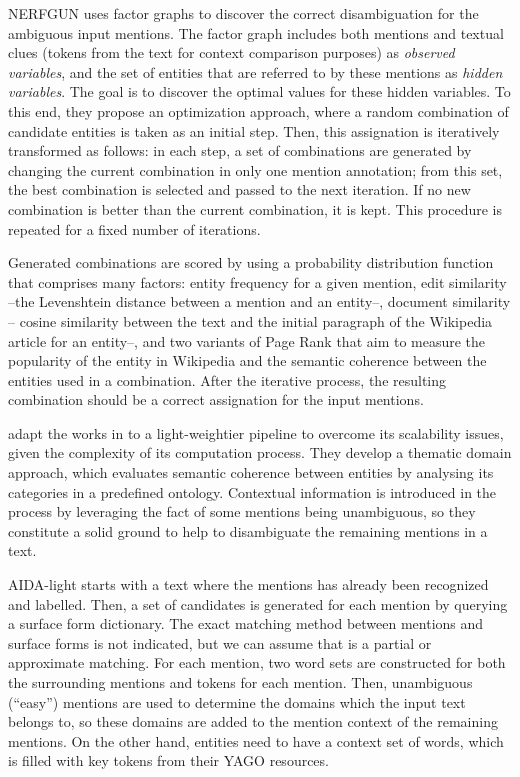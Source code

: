 NERFGUN uses factor graphs \cite{kschischang2001factorgraphs} to discover the correct disambiguation for the ambiguous input mentions. The factor graph includes both mentions and textual clues (tokens from the text for context comparison purposes) as \emph{observed variables}, and the set of entities that are referred to by these mentions as \emph{hidden variables}. The goal is to discover the optimal values for these hidden variables. To this end, they propose an optimization approach, where a random combination of candidate entities is taken as an initial step. Then, this assignation is iteratively transformed as follows: in each step, a set of combinations are generated by changing the current combination in only one mention annotation; from this set, the best combination is selected and passed to the next iteration. If no new combination is better than the current combination, it is kept. This procedure is repeated for a fixed number of iterations.

Generated combinations are scored by using a probability distribution function that comprises many factors:  entity frequency for a given mention, edit similarity --the Levenshtein distance between a mention and an entity--,  document similarity -- cosine similarity between the text and the initial paragraph of the Wikipedia article for an entity--, and two variants of Page Rank that aim to measure the popularity of the entity in Wikipedia and the semantic coherence between the entities used in a combination. After the iterative process, the resulting combination should be a correct assignation for the input mentions.

\medskip

\cite{nguyen2014} adapt the works in \cite{yosef2011} to a light-weightier pipeline to overcome its scalability issues, given the complexity of its computation process. They develop a thematic domain approach, which evaluates semantic coherence between entities by analysing its categories in a predefined ontology. Contextual information is introduced in the process by leveraging the fact of some mentions being unambiguous, so they constitute a solid ground to help to disambiguate the remaining mentions in a text.

AIDA-light starts with a text where the mentions has already been recognized and labelled. Then, a set of candidates is generated for each mention by querying a surface form dictionary. The exact matching method between mentions and surface forms is not indicated, but we can assume that is a partial or approximate matching. For each mention, two word sets are constructed for both the surrounding mentions and tokens for each mention. Then, unambiguous (``easy'') mentions are used to determine the domains which the input text belongs to, so these domains are added to the mention context of the remaining mentions. On the other hand, entities need to have a context set of words, which is filled with key tokens from their YAGO resources.

